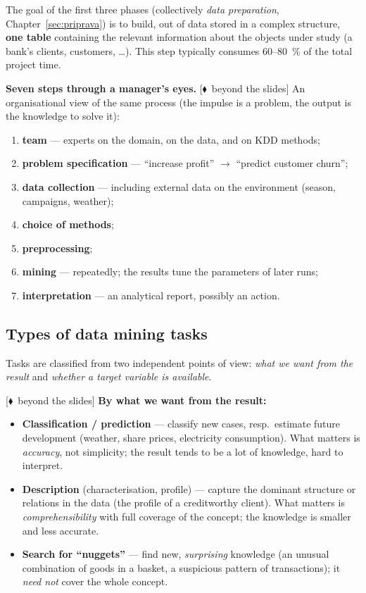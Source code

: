 \documentclass[11pt,a4paper]{article}
\theoremstyle{definition}
\providecommand{\uv}[1]{``#1''}
\newcommand{\mimo}{\textcolor{markcol}{\textsf{\footnotesize[$\blacklozenge$~beyond the slides]}}}
\begin{document}
The goal of the first three phases (collectively \emph{data preparation},
Chapter~\ref{sec:priprava}) is to build, out of data stored in a complex structure, \textbf{one
table} containing the relevant information about the objects under study (a bank's clients,
customers, \dots). This step typically consumes 60--80~\% of the total project time.

\textbf{Seven steps through a manager's eyes.} \mimo{} An organisational view of the same
process (the impulse is a problem, the output is the knowledge to solve it):
\begin{enumerate}
\item \textbf{team} --- experts on the domain, on the data, and on KDD methods;
\item \textbf{problem specification} --- \uv{increase profit} $\to$ \uv{predict customer churn};
\item \textbf{data collection} --- including external data on the environment (season,
      campaigns, weather);
\item \textbf{choice of methods};
\item \textbf{preprocessing};
\item \textbf{mining} --- repeatedly; the results tune the parameters of later runs;
\item \textbf{interpretation} --- an analytical report, possibly an action.
\end{enumerate}

\subsection{Types of data mining tasks}

Tasks are classified from two independent points of view: \emph{what we want from the result}
and \emph{whether a target variable is available}.

\mimo{} \textbf{By what we want from the result:}
\begin{itemize}
\item \textbf{Classification / prediction} --- classify new cases, resp.\ estimate future
      development (weather, share prices, electricity consumption). What matters is
      \emph{accuracy}, not simplicity; the result tends to be a lot of knowledge, hard to
      interpret.
\item \textbf{Description} (characterisation, profile) --- capture the dominant structure or
      relations in the data (the profile of a creditworthy client). What matters is
      \emph{comprehensibility} with full coverage of the concept; the knowledge is smaller
      and less accurate.
\item \textbf{Search for \uv{nuggets}} --- find new, \emph{surprising} knowledge (an unusual
      combination of goods in a basket, a suspicious pattern of transactions); it \emph{need
      not} cover the whole concept.
\end{itemize}
\end{document}

